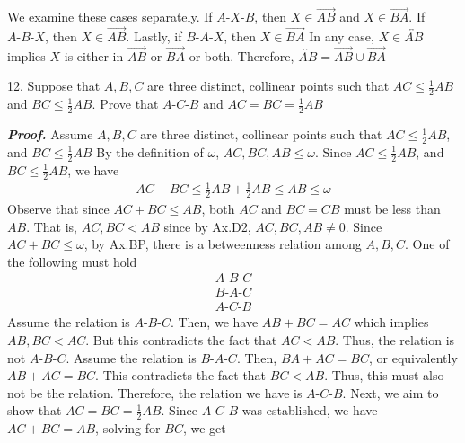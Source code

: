 \documentclass{report}
\begin{document}
    \bigbreak \noindent 
    We examine these cases separately. If $ A\text{-}X\text{-}B$, then $X\in \overrightarrow{AB}$ and $X\in \overrightarrow{BA}$. If $ A\text{-}B\text{-}X$, then $X\in \overrightarrow{AB}$. Lastly, if $ B\text{-}A\text{-}X$, then $X \in \overrightarrow{BA}$
    \bigbreak \noindent 
    In any case, $X \in \overleftrightarrow{AB}$ implies $X$ is either in $\overrightarrow{AB}$ or $\overrightarrow{BA}$ or both.
    \bigbreak \noindent 
    Therefore, $\overleftrightarrow{AB} = \overrightarrow{AB} \cup \overrightarrow{BA}$ \endpf

    \bigbreak \noindent 
    \begin{mdframed}
        12. Suppose that $A,B,C$ are three distinct, collinear points such that $AC \leq \frac{1}{2}AB$ and $BC \leq \frac{1}{2} AB $. Prove that $ A\text{-}C\text{-}B$ and $AC = BC = \frac{1}{2}AB$
    \end{mdframed}
    \bigbreak \noindent 
    \textbf{\textit{Proof.}} Assume $ A,B,C$ are three distinct, collinear points such that $AC \leq \frac{1}{2}AB$, and $BC \leq \frac{1}{2}AB$
    \bigbreak \noindent 
    By the definition of $\omega$, $AC, BC, AB \leq \omega$. Since $ AC \leq \frac{1}{2}AB$, and $BC \leq\frac{1}{2}AB$, we have
    \begin{align*}
        AC + BC \leq \frac{1}{2} AB + \frac{1}{2} AB \leq AB \leq \omega
    \end{align*}
    Observe that since $AC + BC \leq AB$, both $AC$ and $BC = CB$ must be less than $AB$. That is, $AC,BC < AB$ since by Ax.D2, $AC, BC, AB \ne 0$.
    \bigbreak \noindent 
    Since $AC + BC \leq \omega$, by Ax.BP, there is a betweenness relation among $A,B,C$. One of the following must hold
    \begin{align*}
        A\text{-}B\text{-}C \\
        B\text{-}A\text{-}C \\
        A\text{-}C\text{-}B
    \end{align*}
    Assume the relation is $ A\text{-}B\text{-}C $. Then, we have $AB + BC = AC$ which implies $AB,BC < AC $. But this contradicts the fact that $AC < AB$. Thus, the relation is not $ A\text{-}B\text{-}C$. 
    \bigbreak \noindent 
    Assume the relation is $ B\text{-}A\text{-}C$. Then, $BA + AC  = BC$, or equivalently $AB + AC = BC $. This contradicts the fact that $BC < AB$. Thus, this must also not be the relation.
    \bigbreak \noindent 
    Therefore, the relation we have is $ A\text{-}C\text{-}B$.
    \bigbreak \noindent 
    Next, we aim to show that $AC = BC = \frac{1}{2} AB$. Since $ A\text{-}C\text{-}B$ was established, we have $AC + BC = AB$, solving for $BC$, we get 
\end{document}
